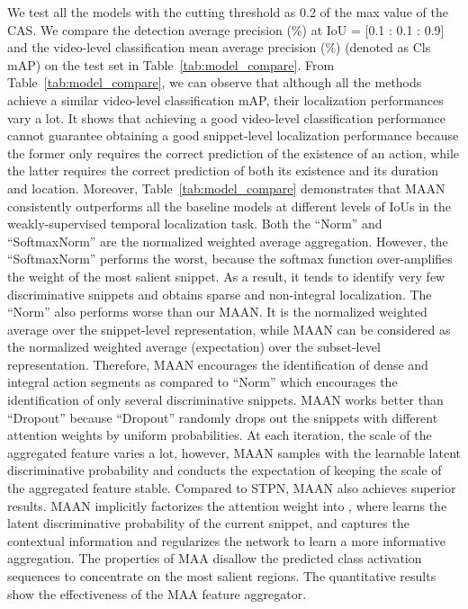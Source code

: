\documentclass{article} \usepackage{iclr2019_conference,times}
\begin{document}
\vspace{-1mm}
We test all the models with the cutting threshold  as 0.2 of the max value of the CAS. We compare the detection average precision (\%) at IoU = [0.1 : 0.1 : 0.9] and the video-level classification mean average precision (\%) (denoted as Cls mAP) on the test set in Table~\ref{tab:model_compare}. From Table~\ref{tab:model_compare}, we can observe that although all the methods achieve a similar video-level classification mAP, their localization performances vary a lot. It shows that achieving a good video-level classification performance cannot guarantee obtaining a good snippet-level localization performance because the former only requires the correct prediction of the existence of an action, while the latter requires the correct prediction of both its existence and its duration and location. Moreover, Table~\ref{tab:model_compare} demonstrates that MAAN consistently outperforms all the baseline models at different levels of IoUs in the weakly-supervised temporal localization task. Both the ``Norm'' and ``SoftmaxNorm'' are the normalized weighted average aggregation. However, the ``SoftmaxNorm'' performs the worst, because the softmax function over-amplifies the weight of the most salient snippet. As a result, it tends to identify very few discriminative snippets and obtains sparse and non-integral localization.  The ``Norm'' also performs worse than our MAAN. It is the normalized weighted average over the snippet-level representation,  while MAAN can be considered as the normalized weighted average (expectation) over the subset-level representation. Therefore, MAAN encourages the identification of dense and integral action segments as compared to ``Norm'' which encourages the identification of only several discriminative snippets. MAAN works better than “Dropout” because “Dropout” randomly drops out the snippets with different attention weights by uniform probabilities. At each iteration, the scale of the aggregated feature varies a lot, however, MAAN samples with the learnable latent discriminative probability and conducts the expectation of keeping the scale of the aggregated feature stable. Compared to STPN, MAAN also achieves superior results. MAAN implicitly factorizes the attention weight into , where  learns the latent discriminative probability of the current snippet, and  captures the contextual information and regularizes the network to learn a more informative aggregation. The properties of MAA disallow the predicted class activation sequences to concentrate on the most salient regions. The quantitative results show the effectiveness of the MAA feature aggregator.
\end{document}
